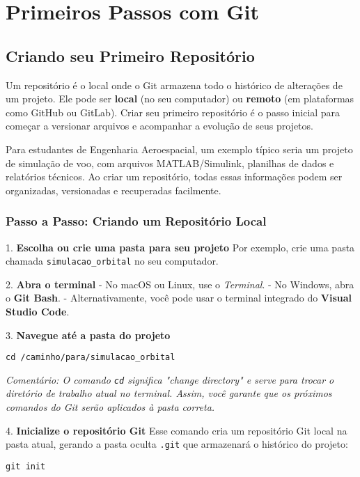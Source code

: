 \newpage
\section{Primeiros Passos com Git}
\subsection{Criando seu Primeiro Repositório}

Um repositório é o local onde o Git armazena todo o histórico de alterações de um projeto. Ele pode ser \textbf{local} (no seu computador) ou \textbf{remoto} (em plataformas como GitHub ou GitLab). Criar seu primeiro repositório é o passo inicial para começar a versionar arquivos e acompanhar a evolução de seus projetos.

Para estudantes de Engenharia Aeroespacial, um exemplo típico seria um projeto de simulação de voo, com arquivos MATLAB/Simulink, planilhas de dados e relatórios técnicos. Ao criar um repositório, todas essas informações podem ser organizadas, versionadas e recuperadas facilmente.

\subsubsection*{Passo a Passo: Criando um Repositório Local}

1. \textbf{Escolha ou crie uma pasta para seu projeto}  
   Por exemplo, crie uma pasta chamada \texttt{simulacao\_orbital} no seu computador.

2. \textbf{Abra o terminal}  
   - No macOS ou Linux, use o \textit{Terminal}.  
   - No Windows, abra o \textbf{Git Bash}.  
   - Alternativamente, você pode usar o terminal integrado do \textbf{Visual Studio Code}.

3. \textbf{Navegue até a pasta do projeto}


\begin{lstlisting}[style=shellstyle]
cd /caminho/para/simulacao_orbital
\end{lstlisting}


\textit{Comentário: O comando \texttt{cd} significa "change directory" e serve para trocar o diretório de trabalho atual no terminal. Assim, você garante que os próximos comandos do Git serão aplicados à pasta correta.}

4. \textbf{Inicialize o repositório Git}  
   Esse comando cria um repositório Git local na pasta atual, gerando a pasta oculta \texttt{.git} que armazenará o histórico do projeto:
\begin{lstlisting}[style=shellstyle]
git init
\end{lstlisting}

